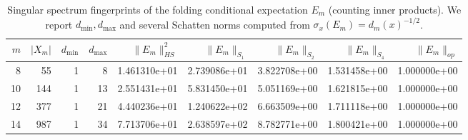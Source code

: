 \begin{table}[H]
\centering
\scriptsize
\setlength{\tabcolsep}{6pt}
\caption{Singular spectrum fingerprints of the folding conditional expectation $E_m$ (counting inner products). We report $d_{\min},d_{\max}$ and several Schatten norms computed from $\sigma_x(E_m)=d_m(x)^{-1/2}$.}
\label{tab:fold_conditional_expectation_singular_spectrum}
\begin{tabular}{r r r r r r r r r}
\toprule
$m$ & $|X_m|$ & $d_{\min}$ & $d_{\max}$ & $\|E_m\|_{HS}^2$ & $\|E_m\|_{S_1}$ & $\|E_m\|_{S_2}$ & $\|E_m\|_{S_4}$ & $\|E_m\|_{op}$\\
\midrule
8 & 55 & 1 & 8 & 1.461310e+01 & 2.739086e+01 & 3.822708e+00 & 1.531458e+00 & 1.000000e+00\\
10 & 144 & 1 & 13 & 2.551431e+01 & 5.831450e+01 & 5.051169e+00 & 1.621815e+00 & 1.000000e+00\\
12 & 377 & 1 & 21 & 4.440236e+01 & 1.240622e+02 & 6.663509e+00 & 1.711118e+00 & 1.000000e+00\\
14 & 987 & 1 & 34 & 7.713706e+01 & 2.638597e+02 & 8.782771e+00 & 1.800421e+00 & 1.000000e+00\\
\bottomrule
\end{tabular}
\end{table}
